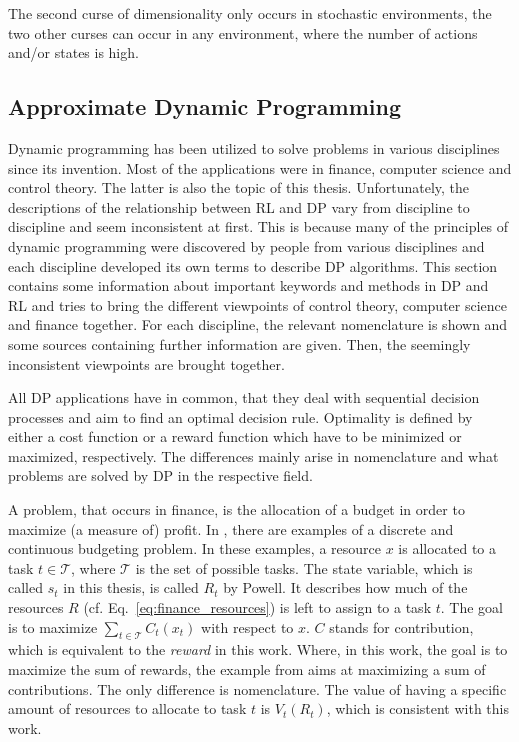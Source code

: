 The second curse of dimensionality only occurs in stochastic environments, the two other curses can occur in any environment, where the number of actions and/or states is high.


\subsection{Approximate Dynamic Programming}

Dynamic programming has been utilized to solve problems in various disciplines since its invention. Most of the applications were in finance, computer science and control theory. The latter is also the topic of this thesis. Unfortunately, the descriptions of the relationship between RL and DP vary from discipline to discipline and seem inconsistent at first. This is because many of the principles of dynamic programming were discovered by people from various disciplines and each discipline developed its own terms to describe DP algorithms. This section contains some information about important keywords and methods in DP and RL and tries to bring the different viewpoints of control theory, computer science and finance together. For each discipline, the relevant nomenclature is shown and some sources containing further information are given. Then, the seemingly inconsistent viewpoints are brought together.

All DP applications have in common, that they deal with sequential decision processes and aim to find an optimal decision rule. Optimality is defined by either a cost function or a reward function which have to be minimized or maximized, respectively. The differences mainly arise in nomenclature and what problems are solved by DP in the respective field. \smallbreak

A problem, that occurs in finance, is the allocation of a budget in order to maximize (a measure of) profit. In \cite[section~2.1.2~f.]{Powell2007ADP}, there are examples of a discrete and continuous budgeting problem. In these examples, a resource $x$ is allocated to a task $t\in\mathcal{T}$, where $\mathcal{T}$ is the set of possible tasks. The state variable, which is called $s_t$ in this thesis, is called $R_t$ by Powell. It describes how much of the resources $R$ (cf. Eq.~\ref{eq:finance_resources}) is left to assign to a task $t$. The goal is to maximize $\sum_{t\in\mathcal{T}} C_t(x_t)$ with respect to $x$. $C$ stands for contribution, which is equivalent to the \textit{reward} in this work. Where, in this work, the goal is to maximize the sum of rewards, the example from \cite{Powell2007ADP} aims at maximizing a sum of contributions. The only difference is nomenclature. The value of having a specific amount of resources to allocate to task $t$ is $V_t(R_t)$, which is consistent with this work.

